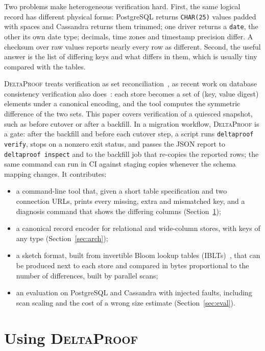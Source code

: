 \documentclass[conference]{IEEEtran}
\newcommand{\sys}{\textsc{DeltaProof}}
\begin{document}
Two problems make heterogeneous verification hard. First, the same logical record has different physical forms: PostgreSQL returns \texttt{CHAR(25)} values padded with spaces and Cassandra returns them trimmed; one driver returns a \texttt{date}, the other its own date type; decimals, time zones and timestamp precision differ. A checksum over raw values reports nearly every row as different. Second, the useful answer is the list of differing keys and what differs in them, which is usually tiny compared with the tables.

\sys{} treats verification as set reconciliation~\cite{eppstein2011}, as recent work on database consistency verification also does~\cite{wu2026}: each store becomes a set of (key, value digest) elements under a canonical encoding, and the tool computes the symmetric difference of the two sets. This paper covers verification of a quiesced snapshot, such as before cutover or after a backfill. In a migration workflow, \sys{} is a gate: after the backfill and before each cutover step, a script runs \texttt{deltaproof verify}, stops on a nonzero exit status, and passes the JSON report to \texttt{deltaproof inspect} and to the backfill job that re-copies the reported rows; the same command can run in CI against staging copies whenever the schema mapping changes. It contributes:
\begin{itemize}
\item a command-line tool that, given a short table specification and two connection URLs, prints every missing, extra and mismatched key, and a diagnosis command that shows the differing columns (Section~\ref{sec:use});
\item a canonical record encoder for relational and wide-column stores, with keys of any type (Section~\ref{sec:arch});
\item a sketch format, built from invertible Bloom lookup tables (IBLTs)~\cite{goodrich2011}, that can be produced next to each store and compared in bytes proportional to the number of differences, built by parallel scans;
\item an evaluation on PostgreSQL and Cassandra with injected faults, including scan scaling and the cost of a wrong size estimate (Section~\ref{sec:eval}).
\end{itemize}

\section{Using \sys{}}\label{sec:use}
\end{document}
